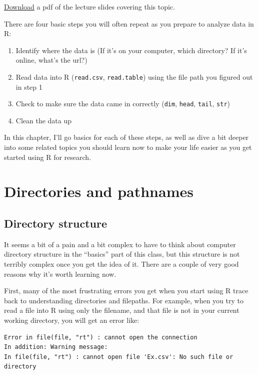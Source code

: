 \documentclass[]{book}
\providecommand{\tightlist}{%
  \setlength{\itemsep}{0pt}\setlength{\parskip}{0pt}}
\theoremstyle{definition}
\theoremstyle{definition}
\theoremstyle{definition}
\theoremstyle{remark}
\begin{document}
\href{https://github.com/geanders/RProgrammingForResearch/raw/master/slides/CourseNotes_Week2.pdf}{Download}
a pdf of the lecture slides covering this topic.

There are four basic steps you will often repeat as you prepare to
analyze data in R:

\begin{enumerate}
\def\labelenumi{\arabic{enumi}.}
\tightlist
\item
  Identify where the data is (If it's on your computer, which directory?
  If it's online, what's the url?)
\item
  Read data into R (\texttt{read.csv}, \texttt{read.table}) using the
  file path you figured out in step 1
\item
  Check to make sure the data came in correctly (\texttt{dim},
  \texttt{head}, \texttt{tail}, \texttt{str})
\item
  Clean the data up
\end{enumerate}

In this chapter, I'll go basics for each of these steps, as well as dive
a bit deeper into some related topics you should learn now to make your
life easier as you get started using R for research.

\section{Directories and pathnames}\label{directories-and-pathnames}

\subsection{Directory structure}\label{directory-structure}

It seems a bit of a pain and a bit complex to have to think about
computer directory structure in the ``basics'' part of this class, but
this structure is not terribly complex once you get the idea of it.
There are a couple of very good reasons why it's worth learning now.

First, many of the most frustrating errors you get when you start using
R trace back to understanding directories and filepaths. For example,
when you try to read a file into R using only the filename, and that
file is not in your current working directory, you will get an error
like:

\begin{verbatim}
Error in file(file, "rt") : cannot open the connection
In addition: Warning message:
In file(file, "rt") : cannot open file 'Ex.csv': No such file or directory
\end{verbatim}
\end{document}
